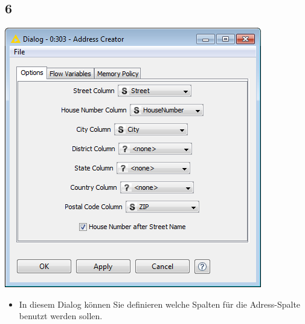 \documentclass{beamer}
\begin{document}
\subsection{6}
\begin{frame}
	\begin{center}
  		\includegraphics[height=0.6\textheight]{6.png}
	\end{center}
	\begin{itemize}
		\item In diesem Dialog können Sie definieren welche Spalten für die Adress-Spalte benutzt werden sollen.		
	\end{itemize}
\end{frame}
\end{document}
